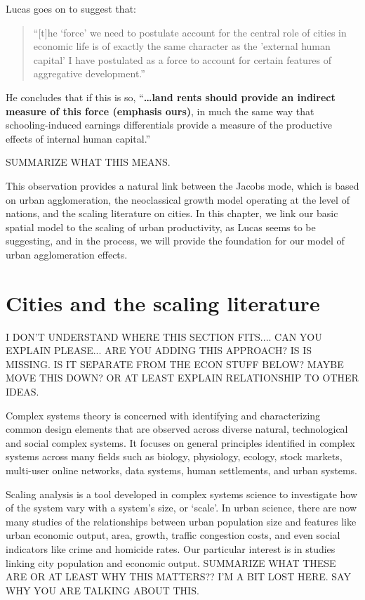 Lucas goes on to suggest that: \begin{quotation} \noindent ``[t]he `force' we need to postulate account for the central role of cities in economic life is of exactly the same character as the 'external human capital' I have postulated as a force to account for certain features of aggregative development.''\end{quotation}  He concludes that if this is so, ``\textbf{\dots land rents should provide an indirect measure of this force (emphasis  ours)}, in much the same way that schooling-induced earnings differentials provide a measure of the productive effects of internal human capital.''


SUMMARIZE WHAT THIS MEANS. 

This observation provides a natural link between the Jacobs mode, which is based on urban agglomeration, the neoclassical growth model operating at the level of nations, and the scaling literature on cities. In this chapter, we link our basic spatial model to the scaling of urban productivity,  as Lucas seems to be suggesting, and in the process,  we will provide the foundation for our model of urban agglomeration effects.

\section{Cities and the scaling literature}

I DON'T UNDERSTAND WHERE THIS SECTION FITS.... CAN YOU EXPLAIN PLEASE... ARE YOU ADDING THIS APPROACH? IS IS MISSING. IS IT SEPARATE FROM THE ECON STUFF BELOW? MAYBE MOVE THIS DOWN? OR AT LEAST EXPLAIN RELATIONSHIP TO OTHER IDEAS. 

Complex systems theory is concerned with identifying and characterizing common design elements that are observed across diverse natural, technological and social complex systems. It focuses on general principles  identified in complex systems across many fields such as biology, physiology, ecology, stock markets, multi-user online  networks, data systems, human settlements, and urban systems.

Scaling analysis is a tool developed in complex systems science to investigate how  of the system vary with a system's size,  or `scale'.  In urban science, there are now many studies of  the relationships between urban population size and  features like urban economic output,  area, growth, traffic congestion costs, and even social  indicators like crime and homicide rates. Our particular interest is in studies linking city population  and  economic output. SUMMARIZE WHAT THESE ARE OR AT LEAST WHY THIS MATTERS?? I'M A BIT LOST HERE. SAY WHY YOU ARE TALKING ABOUT THIS. 

